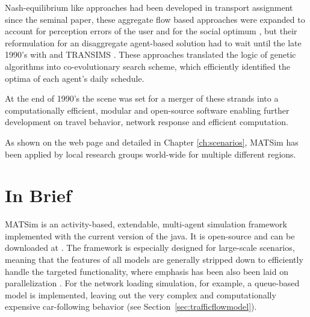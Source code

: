 


Nash-equilibrium like approaches had been developed in transport assignment since the seminal \citet[][]{Wardrop_PICE_1952} paper, these aggregate flow based approaches were expanded to account for perception errors of the user and for the social optimum \citep[see][]{DaganzoSheffi_TransScience_1977}, but their reformulation for an disaggregate agent-based solution had to wait until the late 1990’s with \citet[][]{Gawron_IJMPC_1998} and TRANSIMS \citep[][]{SmithEtAl_NTRPAC_1995}. These approaches translated the logic of genetic algorithms into co-evolutionary search scheme, which efficiently identified the optima of each agent’s daily schedule.

At the end of 1990’s the scene was set for a merger of these strands into a computationally efficient, modular and open-source software enabling further development on travel behavior, network response and efficient computation. 

As shown on the web page \citep[][]{MATSIM-T-Scenarios_Webpage_2015} and detailed in Chapter \ref{ch:scenarios}, MATSim has been applied by local research groups world-wide for multiple different regions. 

\section{In Brief}
\label{sec:inbrief}
MATSim is an activity-based, extendable, multi-agent simulation framework 
implemented with the current version of the \gls{java}. It is open-source and can be downloaded at \citep[][]{MATSIM-T_Webpage_2015, SourceForge_Webpage_2015}. The framework is especially designed for large-scale scenarios, meaning that the features of all models are generally stripped down to efficiently handle the targeted functionality, where emphasis has been also been laid on parallelization \citep[e.g.,][]{Dobler_TechRep_IVT_2011, Charypar_PhDThesis_2008}. For the network loading simulation, for example, a queue-based model is implemented, leaving out the very complex and computationally expensive car-following behavior (see Section~\ref{sec:trafficflowmodel}).

